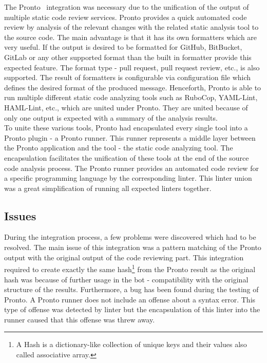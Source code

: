 The Pronto~\cite{GITHUB-PRONTO} integration was necessary due to the unification of the output of multiple static code review services. Pronto provides a quick automated code review by analysis of the relevant changes with the related static analysis tool to the source code. The main advantage is that it has its own formatters which are very useful. If the output is desired to be formatted for GitHub, BitBucket, GitLab or any other supported format than the built in formatter provide this expected feature. The format type - pull request, pull request review, etc., is also supported. The result of formatters is configurable via configuration file which defines the desired format of the produced message. Henceforth, Pronto is able to run multiple different static code analyzing tools such as RuboCop, YAML-Lint, HAML-Lint, etc., which are united under Pronto. They are united because of only one output is expected with a summary of the analysis results.\\

To unite these various tools, Pronto had encapsulated every single tool into a Pronto plugin - a Pronto runner. This runner represents a middle layer between the Pronto application and the tool - the static code analyzing tool. The encapsulation facilitates the unification of these tools at the end of the source code analysis process. The Pronto runner provides an automated code review for a specific programming language by the corresponding linter. This linter union was a great simplification of running all expected linters together.

\subsection{Issues}

During the integration process, a few problems were discovered which had to be resolved. The main issue of this integration was a pattern matching of the Pronto output with the original output of the code reviewing part. This integration required to create exactly the same hash\footnote{A Hash is a dictionary-like collection of unique keys and their values also called associative array.} from the Pronto result as the original hash was because of further usage in the bot - compatibility with the original structure of the results. Furthermore, a bug has been found during the testing of Pronto. A Pronto runner does not include an offense about a syntax error. This type of offense was detected by linter but the encapsulation of this linter into the runner caused that this offense was threw away.

